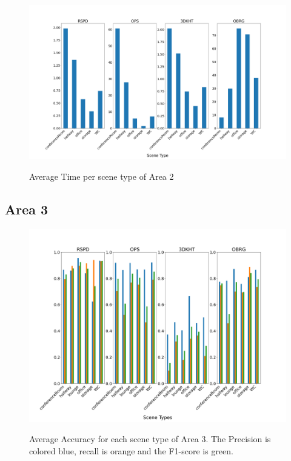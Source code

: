 \documentclass[main.tex]{subfiles}
\begin{document}
\begin{figure}[H]
    \centering
    \includegraphics[width=15 cm]{images/area_2_time.png}
    \label{fig:area2T}
    \caption[Times Area 2]{Average Time per scene type of Area 2}
\end{figure}

\subsection{Area 3}

\begin{figure}[H]
    \centering
    \includegraphics[width=15 cm]{images/area_3_acc.png}
    \label{fig:area3A}
    \caption[Accuracies Area 3]{Average Accuracy for each scene type of Area 3. The Precision
        is colored blue, recall is orange and the F1-score is green. }
\end{figure}
\end{document}
